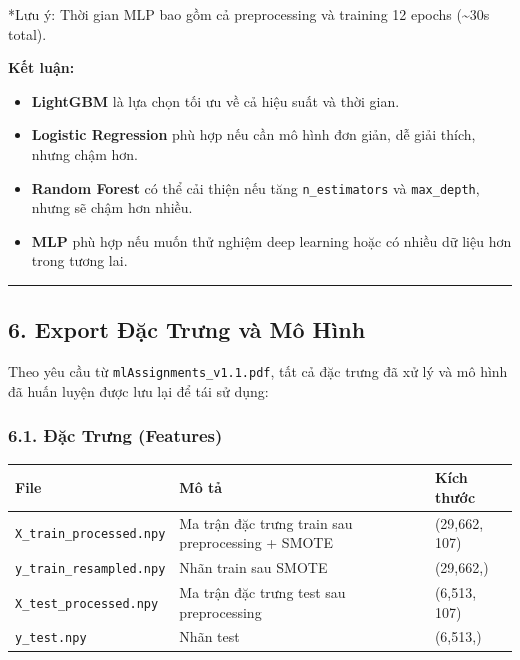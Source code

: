 \documentclass[
]{article}
\newcounter{none} %
\providecommand{\tightlist}{%
  \setlength{\itemsep}{0pt}\setlength{\parskip}{0pt}}
\begin{document}
*Lưu ý: Thời gian MLP bao gồm cả preprocessing và training 12 epochs
(\textasciitilde30s total).

\textbf{Kết luận:}

\begin{itemize}
\tightlist
\item
  \textbf{LightGBM} là lựa chọn tối ưu về cả hiệu suất và thời gian.
\item
  \textbf{Logistic Regression} phù hợp nếu cần mô hình đơn giản, dễ giải
  thích, nhưng chậm hơn.
\item
  \textbf{Random Forest} có thể cải thiện nếu tăng
  \texttt{n\_estimators} và \texttt{max\_depth}, nhưng sẽ chậm hơn
  nhiều.
\item
  \textbf{MLP} phù hợp nếu muốn thử nghiệm deep learning hoặc có nhiều
  dữ liệu hơn trong tương lai.
\end{itemize}

\begin{center}\rule{0.5\linewidth}{0.5pt}\end{center}

\subsection{6. Export Đặc Trưng và Mô
Hình}\label{6-export-ux111ux1eb7c-trux1b0ng-vuxe0-muxf4-huxecnh}

Theo yêu cầu từ \texttt{mlAssignments\_v1.1.pdf}, tất cả đặc trưng đã xử
lý và mô hình đã huấn luyện được lưu lại để tái sử dụng:

\subsubsection{6.1. Đặc Trưng
(Features)}\label{61-ux111ux1eb7c-trux1b0ng-features}

{\def\LTcaptype{none} %
\begin{longtable}[]{@{}lll@{}}
\toprule\noalign{}
File & Mô tả & Kích thước \\
\midrule\noalign{}
\endhead
\bottomrule\noalign{}
\endlastfoot
\texttt{X\_train\_processed.npy} & Ma trận đặc trưng train sau
preprocessing + SMOTE & (29,662, 107) \\
\texttt{y\_train\_resampled.npy} & Nhãn train sau SMOTE & (29,662,) \\
\texttt{X\_test\_processed.npy} & Ma trận đặc trưng test sau
preprocessing & (6,513, 107) \\
\texttt{y\_test.npy} & Nhãn test & (6,513,) \\
\end{longtable}
}
\end{document}
